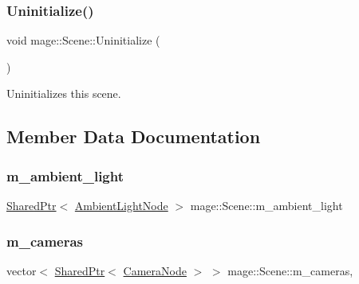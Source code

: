 \hypertarget{classmage_1_1_scene_a714dc33c04dc2b8e2cec93564905b174}{}\label{classmage_1_1_scene_a714dc33c04dc2b8e2cec93564905b174} 
\subsubsection{\texorpdfstring{Uninitialize()}{Uninitialize()}}
{\footnotesize\ttfamily void mage\+::\+Scene\+::\+Uninitialize (\begin{DoxyParamCaption}{ }\end{DoxyParamCaption})}

Uninitializes this scene. 

\subsection{Member Data Documentation}
\hypertarget{classmage_1_1_scene_a0ce9718f4b0137a52b858a29d3504328}{}\label{classmage_1_1_scene_a0ce9718f4b0137a52b858a29d3504328} 
\subsubsection{\texorpdfstring{m\+\_\+ambient\+\_\+light}{m\_ambient\_light}}
{\footnotesize\ttfamily \hyperlink{namespacemage_a1e01ae66713838a7a67d30e44c67703e}{Shared\+Ptr}$<$ \hyperlink{namespacemage_ab0783a7428706251f8561dc30a4d228d}{Ambient\+Light\+Node} $>$ mage\+::\+Scene\+::m\+\_\+ambient\+\_\+light\hspace{0.3cm}{\ttfamily [private]}}

\hypertarget{classmage_1_1_scene_a76fc089ae3185c82702d2ca42fd820e7}{}\label{classmage_1_1_scene_a76fc089ae3185c82702d2ca42fd820e7} 
\subsubsection{\texorpdfstring{m\+\_\+cameras}{m\_cameras}}
{\footnotesize\ttfamily vector$<$ \hyperlink{namespacemage_a1e01ae66713838a7a67d30e44c67703e}{Shared\+Ptr}$<$ \hyperlink{classmage_1_1_camera_node}{Camera\+Node} $>$ $>$ mage\+::\+Scene\+::m\+\_\+cameras\hspace{0.3cm}{\ttfamily [mutable]}, {\ttfamily [private]}}

